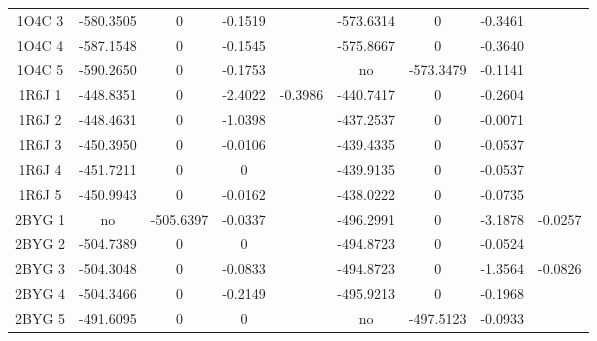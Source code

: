 \documentclass[a4paper,12pt]{article}
\begin{document}
\begin{table}[h]
\begin{tabular}{|c|c|c|c|c|c|c|c|c|}
        1O4C 3 & -580.3505 & 0 & -0.1519 & &                  -573.6314 & 0 & -0.3461 & \\            
        1O4C 4 & -587.1548 & 0 & -0.1545 & &                  -575.8667 & 0 & -0.3640 & \\            
        1O4C 5 & -590.2650 & 0 & -0.1753 & &                  no & -573.3479 & -0.1141 & \\           
        1R6J 1 & -448.8351 & 0 & -2.4022 & -0.3986 &          -440.7417 & 0 & -0.2604 & \\            
        1R6J 2 & -448.4631 & 0 & -1.0398 & &                  -437.2537 & 0 & -0.0071 & \\            
        1R6J 3 & -450.3950 & 0 & -0.0106 & &                  -439.4335 & 0 & -0.0537 & \\            
        1R6J 4 & -451.7211 & 0 & 0 & &                        -439.9135 & 0 & -0.0537 & \\            
        1R6J 5 & -450.9943 & 0 & -0.0162 & &                  -438.0222 & 0 & -0.0735 & \\            
        2BYG 1 & no & -505.6397 & -0.0337 & &                  -496.2991 & 0 & -3.1878 & -0.0257 \\    
        2BYG 2 & -504.7389 & 0 & 0 & &                        -494.8723 & 0 & -0.0524 & \\            
        2BYG 3 & -504.3048 & 0 & -0.0833 & &                  -494.8723 & 0 & -1.3564 & -0.0826\\     
        2BYG 4 & -504.3466 & 0 & -0.2149 & &                  -495.9213 & 0 & -0.1968 & \\            
        2BYG 5 & -491.6095 & 0 & 0 & &                        no & -497.5123 & -0.0933 & \\           
        
        \hline


 \end{tabular}      
 \label{tab_echec2BYG__1}      
\end{table}
\end{document}
